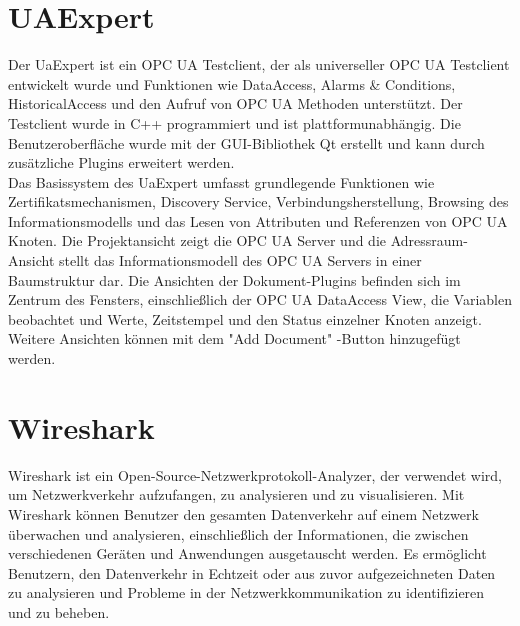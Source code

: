 \section{UAExpert}
Der UaExpert ist ein OPC UA Testclient, der als universeller OPC UA Testclient entwickelt wurde und Funktionen wie DataAccess, Alarms \& Conditions, HistoricalAccess und den Aufruf von OPC UA Methoden unterstützt. Der Testclient wurde in C++ programmiert und ist plattformunabhängig. Die Benutzeroberfläche wurde mit der GUI-Bibliothek Qt erstellt und kann durch zusätzliche Plugins erweitert werden.\\

Das Basissystem des UaExpert umfasst grundlegende Funktionen wie Zertifikatsmechanismen, Discovery Service, Verbindungsherstellung, Browsing des Informationsmodells und das Lesen von Attributen und Referenzen von OPC UA Knoten. Die Projektansicht zeigt die OPC UA Server und die Adressraum-Ansicht stellt das Informationsmodell des OPC UA Servers in einer Baumstruktur dar. Die Ansichten der Dokument-Plugins befinden sich im Zentrum des Fensters, einschließlich der OPC UA DataAccess View, die Variablen beobachtet und Werte, Zeitstempel und den Status einzelner Knoten anzeigt. Weitere Ansichten können mit dem "Add Document" -Button hinzugefügt werden.\\
\section{Wireshark}
Wireshark ist ein Open-Source-Netzwerkprotokoll-Analyzer, der verwendet wird, um Netzwerkverkehr aufzufangen, zu analysieren und zu visualisieren. Mit Wireshark können Benutzer den gesamten Datenverkehr auf einem Netzwerk überwachen und analysieren, einschließlich der Informationen, die zwischen verschiedenen Geräten und Anwendungen ausgetauscht werden. Es ermöglicht Benutzern, den Datenverkehr in Echtzeit oder aus zuvor aufgezeichneten Daten zu analysieren und Probleme in der Netzwerkkommunikation zu identifizieren und zu beheben.




